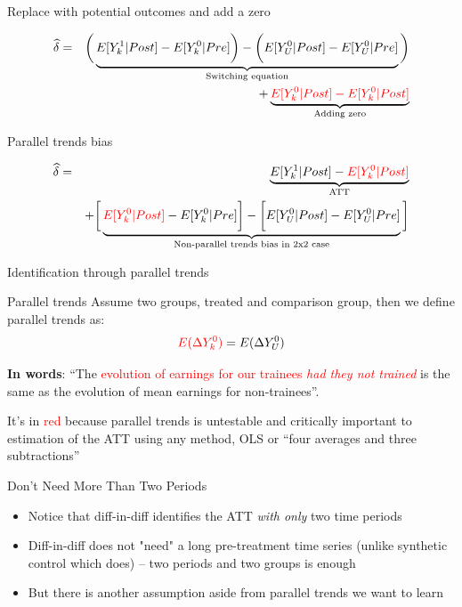 \documentclass{beamer}
\begin{document}
\begin{frame}{Replace with potential outcomes and add a zero}

\begin{eqnarray*}
\widehat{\delta} &=& \bigg ( \underbrace{E[Y^1_k|Post] - E[Y^0_k|Pre] \bigg ) - \bigg ( E[Y^0_U | Post ] - E[ Y^0_U | Pre]}_{\mathclap{\text{Switching equation}}} \bigg)  \\
&&+ \underbrace{\textcolor{red}{E[Y_k^0 |Post] - E[Y^0_k | Post]}}_{\mathclap{\text{Adding zero}}}
\end{eqnarray*}

\end{frame}

\begin{frame}{Parallel trends bias}

\begin{eqnarray*}
\widehat{\delta} &=& \underbrace{E[Y^1_k | Post] - \textcolor{red}{E[Y^0_k | Post]}}_{\mathclap{\text{ATT}}} \\
&& + \bigg [  \underbrace{\textcolor{red}{E[Y^0_k | Post]} - E[Y^0_k | Pre] \bigg ] - \bigg [ E[Y^0_U | Post] - E[Y_U^0 | Pre] }_{\mathclap{\text{Non-parallel trends bias in 2x2 case}}} \bigg ]
\end{eqnarray*}


\end{frame}

\begin{frame}{Identification through parallel trends}


	\begin{block}{Parallel trends}
	Assume two groups, treated and comparison group, then we define parallel trends as:	 $$\textcolor{red}{E(}\textcolor{red}{\Delta Y^0_k)} = E(\Delta Y^0_U)$$
	\end{block}

\textbf{In words}: ``The \textcolor{red}{evolution of earnings for our trainees \emph{had they not trained}} is the same as the evolution of mean earnings for non-trainees''.

\bigskip

It's in \textcolor{red}{red} because parallel trends is untestable and critically important to estimation of the ATT using any method, OLS or ``four averages and three subtractions''

\end{frame}

\begin{frame}{Don't Need More Than Two Periods}

\begin{itemize}

\item Notice that diff-in-diff identifies the ATT \emph{with only} two time periods
\item Diff-in-diff does not "need" a long pre-treatment time series (unlike synthetic control which does) -- two periods and two groups is enough
\item But there is another assumption aside from parallel trends we want to learn

\end{itemize}

\end{frame}
\end{document}
